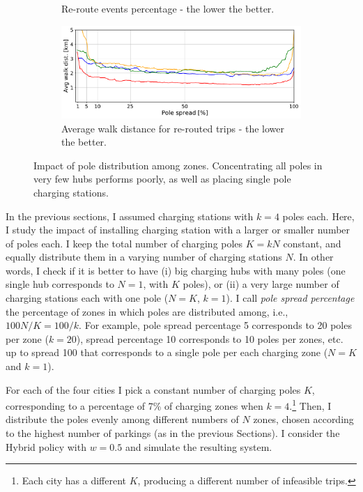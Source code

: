 \begin{figure}[t!]
\begin{center}
\begin{subfigure}{0.49\textwidth}
             \caption{Re-route events percentage - the lower the better.}
             \label{fig:6_8_zoneACS_vs_Reroute}
         \end{subfigure}        
         \begin{subfigure}{0.49\textwidth}
            \includegraphics[width=\columnwidth]{figures/50_AvgWalkedDistance_vsZones_ACS.pdf}
             \caption{Average walk distance for re-routed trips - the lower the better.}
             \label{fig:6_8_zoneACS_vs_awd}
         \end{subfigure}
         \caption{Impact of pole distribution among zones. Concentrating all poles in very few hubs performs poorly, as well as placing single pole charging stations.}
         \label{fig:6_8_zoneACS}
\end{center}
\end{figure}



In the previous sections, I assumed charging stations with $k=4$ poles each. Here, I study the impact of installing charging station with a larger or smaller number of poles each. I keep the total number of charging poles $K=kN$ constant, and equally distribute them in a varying number of charging stations $N$. In other words, I check if it is better to have (i) big charging hubs with many poles (one single hub corresponds to $N=1$, with $K$ poles), or (ii) a very large number of charging stations each with one pole ($N=K$, $k=1$).
I call {\it pole spread percentage} the percentage of zones in which poles are distributed among, i.e., $100N/K = 100/k$. For example, pole spread percentage 5 corresponds to 20 poles per zone ($k=20$), spread percentage 10 corresponds to 10 poles per zones, etc. up to spread 100 that corresponds to a single pole per each charging zone ($N=K$ and $k=1$).

For each of the four cities I pick a constant number of charging poles $K$, corresponding to a percentage of 7\% of charging zones when $k=4$.\footnote{Each city has a different $K$, producing a different number of infeasible trips.} Then, I distribute the poles evenly among different numbers of $N$ zones, chosen according to the highest number of parkings (as in the previous Sections). 
I consider the Hybrid policy with $w=0.5$ and simulate the  resulting system. 

